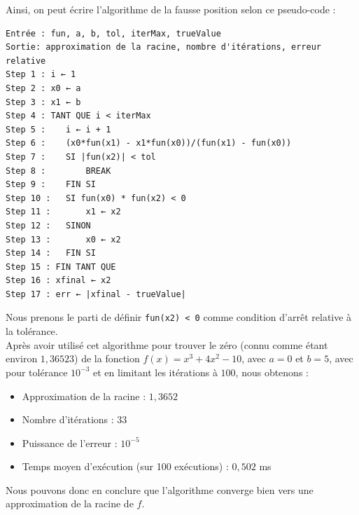 \documentclass[12pt]{article}
\begin{document}
\noindent Ainsi, on peut écrire l'algorithme de la fausse position selon ce pseudo-code :
\begin{verbatim}
Entrée : fun, a, b, tol, iterMax, trueValue
Sortie: approximation de la racine, nombre d'itérations, erreur relative
Step 1 : i ← 1
Step 2 : x0 ← a
Step 3 : x1 ← b
Step 4 : TANT QUE i < iterMax
Step 5 :    i ← i + 1
Step 6 :    (x0*fun(x1) - x1*fun(x0))/(fun(x1) - fun(x0))
Step 7 :    SI |fun(x2)| < tol
Step 8 :        BREAK
Step 9 :    FIN SI
Step 10 :   SI fun(x0) * fun(x2) < 0
Step 11 :       x1 ← x2
Step 12 :   SINON
Step 13 :       x0 ← x2
Step 14 :   FIN SI
Step 15 : FIN TANT QUE
Step 16 : xfinal ← x2
Step 17 : err ← |xfinal - trueValue|
\end{verbatim}
\noindent Nous prenons le parti de définir \texttt{fun(x2) < 0} comme condition d'arrêt relative à la tolérance.\\
\noindent Après avoir utilisé cet algorithme pour trouver le zéro (connu comme étant environ $1,36523$) de la fonction $f(x) = x^3 + 4x^2 -10$, avec $a=0$ et $b=5$, avec pour tolérance $10^{-3}$ et en limitant les itérations à $100$, nous obtenons :
\begin{itemize}
    \item Approximation de la racine : $1,3652$
    \item Nombre d'itérations : $33$
    \item Puissance de l'erreur : $10^{-5}$
    \item Temps moyen d'exécution (sur 100 exécutions) : $0,502$ ms
\end{itemize}
Nous pouvons donc en conclure que l'algorithme converge bien vers une approximation de la racine de $f$.



\end{document}
